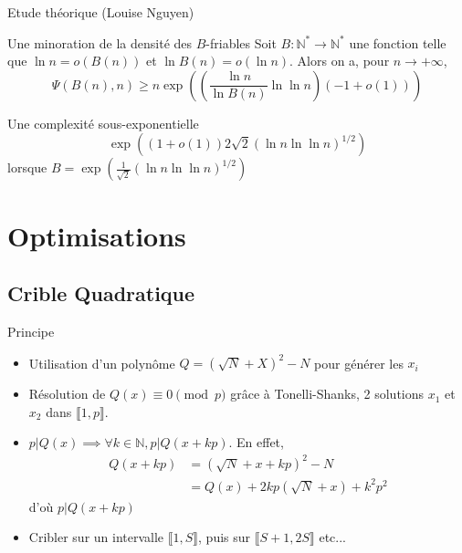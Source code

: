 \documentclass{beamer}
\begin{document}
\begin{frame}{Etude théorique (Louise Nguyen)}
    \begin{block}{Une minoration de la densité des $B$-friables}
    Soit $B : \mathbb N^\ast \to \mathbb N^\ast$ une fonction telle que $\ln n = o(B(n))$ et $\ln B(n) = o (\ln n)$. Alors on a, pour $n \to +\infty$,
    \[
    \Psi(B(n), n) \ge n\exp\left(\left(\frac {\ln n}{\ln B(n)} \ln \ln n\right)(-1 + o(1))\right)
    \]
    \end{block}
    \begin{block}{Une complexité sous-exponentielle}
    \[
    \exp\left((1+ o(1))2{\sqrt 2} (\ln n \ln \ln n)^{1/2}\right)
    \]
    lorsque $B =\exp\left(\frac 1{\sqrt 2}(\ln n\ln \ln n)^{1/2}\right)$
    \end{block}
\end{frame}

\section{Optimisations}
\subsection{Crible Quadratique}

\begin{frame}{Principe}
    \begin{itemize}[<+->]
        \item Utilisation d'un polynôme $Q = (\sqrt N + X)^2 - N$ pour générer les $x_i$
        \item Résolution de $Q(x) \equiv 0 \pmod p$ grâce à Tonelli-Shanks, 2 solutions $x_1$ et $x_2$ dans $\llbracket 1, p \rrbracket$.
        \item $p|Q(x) \implies \forall k\in \mathbb N,  p|Q(x+kp)$. En effet, 
        \begin{align*}
            Q(x+kp) &= (\sqrt N + x+kp)^2 - N \\
                    &= Q(x) + 2kp(\sqrt N + x) + k^2p^2
        \end{align*}
        d'où $p|Q(x+kp)$
        \item Cribler sur un intervalle $\llbracket 1,S \rrbracket$, puis sur $\llbracket S+1,2S \rrbracket$ etc...
    \end{itemize}
\end{frame}


\end{document}
